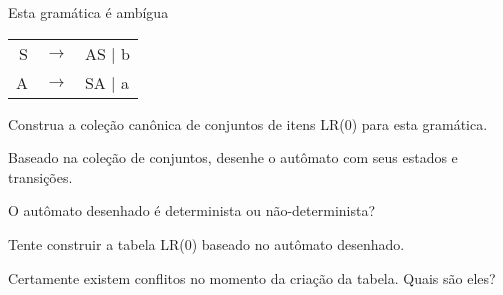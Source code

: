\documentclass{compiladores}
\begin{document}
\begin{listanumerada}
\item Esta gramática é ambígua \\
     \begin{tabular}{rcl}
     S & $\rightarrow$ & AS | b \\
     A & $\rightarrow$ & SA | a
     \end{tabular}
     \begin{lista}
       \item Construa a coleção canônica de conjuntos de itens LR(0) para esta gramática. 
       \item Baseado na coleção de conjuntos, desenhe o autômato com seus estados e transições.
       \item O autômato desenhado é determinista ou não-determinista?
       \item Tente construir a tabela LR(0) baseado no autômato desenhado.
       \item Certamente existem conflitos no momento da criação da tabela. Quais são eles?
     \end{lista}
\end{listanumerada}
\end{document}
